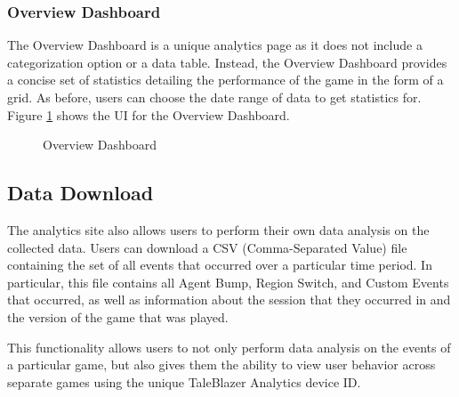 \subsubsection{Overview Dashboard}

The Overview Dashboard is a unique analytics page as it does not include a categorization option or a data table. Instead, the Overview Dashboard provides a concise set of statistics detailing the performance of the game in the form of a grid. As before, users can choose the date range of data to get statistics for. Figure \ref{fig:overview_dashboard} shows the UI for the Overview Dashboard.

\begin{figure}[hbt]
	\caption[Analytics Site: Overview Dashboard]{\label{fig:overview_dashboard} Overview Dashboard}
\end{figure}


\subsection{Data Download}

The analytics site also allows users to perform their own data analysis on the collected data. Users can download a CSV (Comma-Separated Value) file containing the set of all events that occurred over a particular time period. In particular, this file contains all Agent Bump, Region Switch, and Custom Events that occurred, as well as information about the session that they occurred in and the version of the game that was played. 

This functionality allows users to not only perform data analysis on the events of a particular game, but also gives them the ability to view user behavior across separate games using the unique TaleBlazer Analytics device ID. 
















	




















